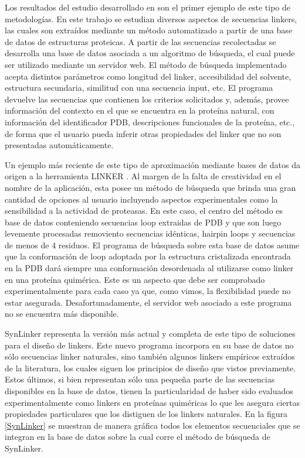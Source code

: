 Los resultados del estudio desarrollado en \cite{george2002analysis} son el primer ejemplo de este tipo de metodologías.
En este trabajo se estudian diversos aspectos de secuencias linkers, las cuales son extraídos mediante un método automatizado a partir de una base de datos de estructuras proteicas. 
A partir de las secuencias recolectadas se desarrolla una base de datos asociada a un algoritmo de búsqueda, el cual puede ser utilizado mediante un servidor web\cite{linkerdbIBIVU}.
El método de búsqueda implementado acepta distintos parámetros como longitud del linker, accesibilidad del solvente, estructura secundaria, similitud con una secuencia input, etc.
El programa devuelve las secuencias que contienen los criterios solicitados y, además, provee información del contexto en el que se encuentra en la proteína natural, con información del identificador PDB, 
descripciones funcionales de la proteína, etc., de forma que el usuario pueda inferir otras propiedades del linker que no son presentadas automáticamente.


Un ejemplo más reciente de este tipo de aproximación mediante bases de datos da origen a la herramienta LINKER \cite{crasto2000linker,xue2004linker}.
Al margen de la falta de creatividad en el nombre de la aplicación, esta posee un método de búsqueda que brinda una gran cantidad de opciones al usuario incluyendo aspectos experimentales como la sensibilidad a la actividad de proteasas.
En este caso, el centro del método es base de datos conteniendo secuencias loop extraidas de PDB y que son luego levemente procesadas removiento secuencias idénticas, hairpin loops y secuencias de menos de 4 residuos. 
El programa de búsqueda sobre esta base de datos asume que la conformación de loop adoptada por la estructura cristalizada encontrada en la PDB dará siempre una conformación desordenada al utilizarse como linker en una proteína quimérica.
Este es un aspecto que debe ser comprobado experimentalmente para cada caso ya que, como vimos, la flexibilidad puede no estar asegurada.
Desafortunadamente, el servidor web asociado a este programa no se encuentra más disponible.


SynLinker\cite{liu2015synlinker} representa la versión más actual y completa de este tipo de soluciones para el diseño de linkers. 
Este nuevo programa incorpora en su base de datos no sólo secuencias linker naturales, sino también algunos linkers empíricos extraídos de la literatura, 
los cuales siguen los principios de diseño que vistos previamente. Estos últimos, si bien representan sólo una pequeña parte de las secuencias disponibles en la base de datos, 
tienen la particularidad de haber sido evaluados experimentalmente como linkers en proteínas quiméricas lo que les asegura ciertas propiedades particulares que los distiguen de los linkers naturales.
En la figura \ref{SynLinker} se muestran de manera gráfica todos los elementos secuenciales que se integran en la base de datos sobre la cual corre el método de búsqueda de SynLinker.

